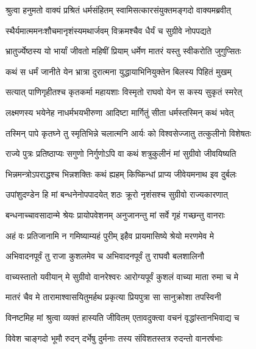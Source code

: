 
\twolineshloka
{श्रुत्वा हनुमतो वाक्यं प्रश्रितं धर्मसंहितम्}
{स्वामिसत्कारसंयुक्तमङ्गदो वाक्यमब्रवीत्} %

\twolineshloka
{स्थैर्यमात्ममनःशौचमानृशंस्यमथार्जवम्}
{विक्रमश्चैव धैर्यं च सुग्रीवे नोपपद्यते} %

\twolineshloka
{भ्रातुर्ज्येष्ठस्य यो भार्यां जीवतो महिषीं प्रियाम्}
{धर्मेण मातरं यस्तु स्वीकरोति जुगुप्सितः} %

\twolineshloka
{कथं स धर्मं जानीते येन भ्रात्रा दुरात्मना}
{युद्धायाभिनियुक्तेन बिलस्य पिहितं मुखम्} %

\twolineshloka
{सत्यात् पाणिगृहीतश्च कृतकर्मा महायशाः}
{विस्मृतो राघवो येन स कस्य सुकृतं स्मरेत्} %

\twolineshloka
{लक्ष्मणस्य भयेनेह नाधर्मभयभीरुणा}
{आदिष्टा मार्गितुं सीता धर्मस्तस्मिन् कथं भवेत्} %

\twolineshloka
{तस्मिन् पापे कृतघ्ने तु स्मृतिभिन्ने चलात्मनि}
{आर्यः को विश्वसेज्जातु तत्कुलीनो विशेषतः} %

\twolineshloka
{राज्ये पुत्रः प्रतिष्ठाप्यः सगुणो निर्गुणोऽपि वा}
{कथं शत्रुकुलीनं मां सुग्रीवो जीवयिष्यति} %

\twolineshloka
{भिन्नमन्त्रोऽपराद्धश्च भिन्नशक्तिः कथं ह्यहम्}
{किष्किन्धां प्राप्य जीवेयमनाथ इव दुर्बलः} %

\twolineshloka
{उपांशुदण्डेन हि मां बन्धनेनोपपादयेत्}
{शठः क्रूरो नृशंसश्च सुग्रीवो राज्यकारणात्} %

\twolineshloka
{बन्धनाच्चावसादान्मे श्रेयः प्रायोपवेशनम्}
{अनुजानन्तु मां सर्वे गृहं गच्छन्तु वानराः} %

\twolineshloka
{अहं वः प्रतिजानामि न गमिष्याम्यहं पुरीम्}
{इहैव प्रायमासिष्ये श्रेयो मरणमेव मे} %

\twolineshloka
{अभिवादनपूर्वं तु राजा कुशलमेव च}
{अभिवादनपूर्वं तु राघवौ बलशालिनौ} %

\twolineshloka
{वाच्यस्तातो यवीयान् मे सुग्रीवो वानरेश्वरः}
{आरोग्यपूर्वं कुशलं वाच्या माता रुमा च मे} %

\twolineshloka
{मातरं चैव मे तारामाश्वासयितुमर्हथ}
{प्रकृत्या प्रियपुत्रा सा सानुक्रोशा तपस्विनी} %

\twolineshloka
{विनष्टमिह मां श्रुत्वा व्यक्तं हास्यति जीवितम्}
{एतावदुक्त्वा वचनं वृद्धांस्तानभिवाद्य च} %

\twolineshloka
{विवेश चाङ्गदो भूमौ रुदन् दर्भेषु दुर्मनाः}
{तस्य संविशतस्तत्र रुदन्तो वानरर्षभाः} %

